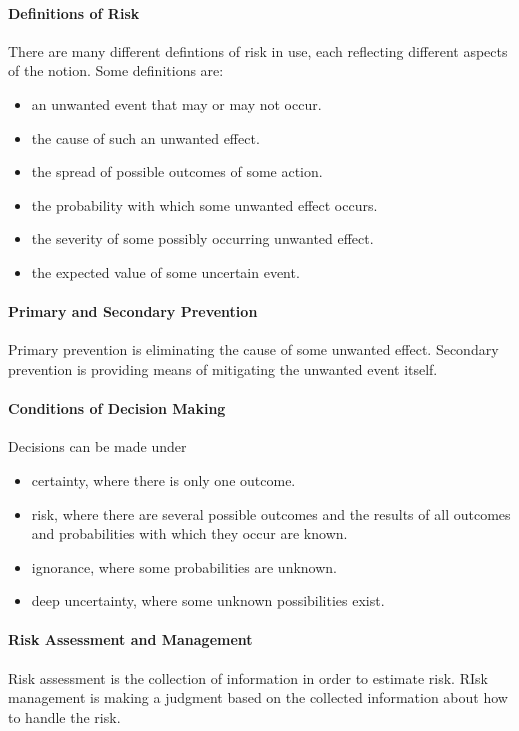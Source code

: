 \paragraph{Definitions of Risk}
There are many different defintions of risk in use, each reflecting different aspects of the notion. Some definitions are:
\begin{itemize}
	\item an unwanted event that may or may not occur.
	\item the cause of such an unwanted effect.
	\item the spread of possible outcomes of some action.
	\item the probability with which some unwanted effect occurs.
	\item the severity of some possibly occurring unwanted effect.
	\item the expected value of some uncertain event.
\end{itemize}

\paragraph{Primary and Secondary Prevention}
Primary prevention is eliminating the cause of some unwanted effect. Secondary prevention is providing means of mitigating the unwanted event itself.

\paragraph{Conditions of Decision Making}
Decisions can be made under
\begin{itemize}
	\item certainty, where there is only one outcome.
	\item risk, where there are several possible outcomes and the results of all outcomes and probabilities with which they occur are known.
	\item ignorance, where some probabilities are unknown.
	\item deep uncertainty, where some unknown possibilities exist.
\end{itemize}

\paragraph{Risk Assessment and Management}
Risk assessment is the collection of information in order to estimate risk. RIsk management is making a judgment based on the collected information about how to handle the risk.

